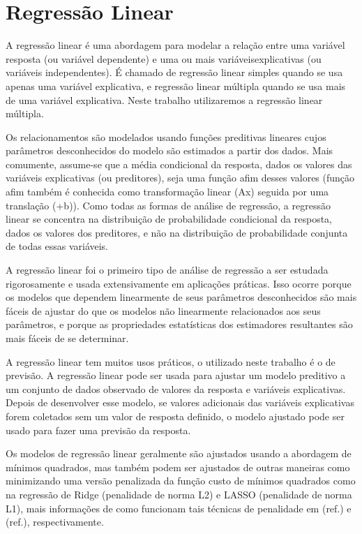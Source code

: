 \section{Regressão Linear}
\label{sec:regressao_linear}

A regressão linear é uma abordagem para modelar a relação entre uma variável resposta (ou variável dependente) e uma ou mais variáveis ​​explicativas (ou variáveis ​​independentes). É chamado de regressão linear simples quando se usa apenas uma variável explicativa, e regressão linear múltipla quando se usa mais de uma variável explicativa. Neste trabalho utilizaremos a regressão linear múltipla.

Os relacionamentos são modelados usando funções preditivas lineares cujos parâmetros desconhecidos do modelo são estimados a partir dos dados. Mais comumente, assume-se que a média condicional da resposta, dados os valores das variáveis ​​explicativas (ou preditores), seja uma função afim desses valores (função afim também é conhecida como transformação linear (Ax) seguida por uma translação (+b)). Como todas as formas de análise de regressão, a regressão linear se concentra na distribuição de probabilidade condicional da resposta, dados os valores dos preditores, e não na distribuição de probabilidade conjunta de todas essas variáveis.

A regressão linear foi o primeiro tipo de análise de regressão a ser estudada rigorosamente e usada extensivamente em aplicações práticas. Isso ocorre porque os modelos que dependem linearmente de seus parâmetros desconhecidos são mais fáceis de ajustar do que os modelos não linearmente relacionados aos seus parâmetros, e porque as propriedades estatísticas dos estimadores resultantes são mais fáceis de se determinar.

A regressão linear tem muitos usos práticos, o utilizado neste trabalho é o de previsão. A regressão linear pode ser usada para ajustar um modelo preditivo a um conjunto de dados observado de valores da resposta e variáveis ​​explicativas. Depois de desenvolver esse modelo, se valores adicionais das variáveis ​​explicativas forem coletados sem um valor de resposta definido, o modelo ajustado pode ser usado para fazer uma previsão da resposta.

Os modelos de regressão linear geralmente são ajustados usando a abordagem de mínimos quadrados, mas também podem ser ajustados de outras maneiras como minimizando uma versão penalizada da função custo de mínimos quadrados como na regressão de Ridge (penalidade de norma L2) e LASSO (penalidade de norma L1), mais informações de como funcionam tais técnicas de penalidade em (ref.) e (ref.), respectivamente.

